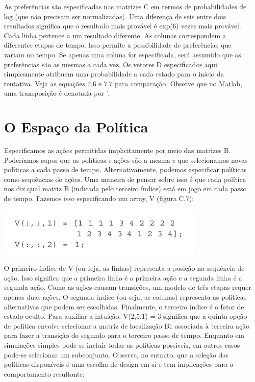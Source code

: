 \documentclass[
  12pt,
]{book}
\begin{document}
As preferências são especificadas nas matrizes C em termos de probabilidades de log (que não precisam ser normalizadas). Uma diferença de seis entre dois resultados significa que o resultado mais provável é exp(6) vezes mais provável. Cada linha pertence a um resultado diferente. As colunas correspondem a diferentes etapas de tempo. Isso permite a possibilidade de preferências que variam no tempo. Se apenas uma coluna for especificada, será assumido que as preferências são as mesmas a cada vez. Os vetores D especificados aqui simplesmente atribuem uma probabilidade a cada estado para o início da tentativa. Veja as equações 7.6 e 7.7 para comparação. Observe que no Matlab, uma transposição é denotada por '.

\hypertarget{o-espauxe7o-da-poluxedtica}{%
\section{O Espaço da Política}\label{o-espauxe7o-da-poluxedtica}}

Especificamos as ações permitidas implicitamente por meio das matrizes B. Poderíamos supor que as políticas e ações são a mesma e que selecionamos novas políticas a cada passo de tempo. Alternativamente, podemos especificar políticas como sequências de ações. Uma maneira de pensar sobre isso é que cada política nos diz qual matriz B (indicada pelo terceiro índice) está em jogo em cada passo de tempo. Fazemos isso especificando um array, V (figura C.7):

\includegraphics{images/Figura_C7.png}

O primeiro índice de V (ou seja, as linhas) representa a posição na sequência de ação. Isso significa que a primeira linha é a primeira ação e a segunda linha é a segunda ação. Como as ações causam transições, um modelo de três etapas requer apenas duas ações. O segundo índice (ou seja, as colunas) representa as políticas alternativas que podem ser escolhidas. Finalmente, o terceiro índice é o fator de estado oculto. Para auxiliar a intuição, V(2,5,1) = 3 significa que a quinta opção de política envolve selecionar a matriz de localização B1 associada à terceira ação para fazer a transição do segundo para o terceiro passo de tempo. Enquanto em simulações simples pode-se incluir todas as políticas possíveis, em outros casos pode-se selecionar um subconjunto. Observe, no entanto, que a seleção das políticas disponíveis é uma escolha de design em si e tem implicações para o comportamento resultante.
\end{document}
